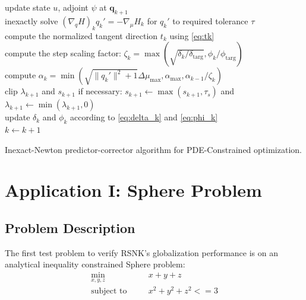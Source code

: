\begin{algorithm}[H]
{  
  update state $u$, adjoint $\psi$ at $\boldsymbol{q}_{k+1}$ \\ 
  \ShowLn
   inexactly solve $\left(\nabla_q H\right)_{k} q_{k}' = - \nabla_\mu H_{k}$
  for $q_{k}'$ to required tolerance $\tau$   \label{line:tang} \\
  compute the normalized tangent direction $t_{k}$ using \eqref{eq:tk} \\
  compute the step scaling factor: $\zeta_{k} = \max\left( \sqrt{\delta_k/\delta_{\text{targ}}}, \phi_k / \phi_{\text{targ}} \right)$\\
  compute $\alpha_{k} = \min\left( \sqrt{\|q_{k}'\|^2 + 1}\Delta \mu_{\max}, \alpha_{\max}, \alpha_{k-1}/\zeta_{k} \right)$\\
  clip $\lambda_{k+1}$ and $s_{k+1}$ if necessary: $s_{k+1} \leftarrow \max(s_{k+1},\tau_s)$ and
  $\lambda_{k+1} \leftarrow \min(\lambda_{k+1},0)$ \\
  update $\delta_k$ and $\phi_{k}$ according to \eqref{eq:delta_k} and
  \eqref{eq:phi_k} \\
  $k \leftarrow k+1$
  }
\caption{Inexact-Newton predictor-corrector algorithm for PDE-Constrained
  optimization.\label{alg:pc}}
\end{algorithm}

\newpage
\section{Application I: Sphere Problem}
\subsection{Problem Description}
The first test problem to verify RSNK's globalization performance is on an analytical inequality constrained Sphere problem: 
\begin{equation*}
\begin{aligned}
\underset{x, y, z} {\text{min}}  & \quad & x + y + z \\
   {\text{subject to}}  & \quad & x^2 + y^2 + z^2 <= 3 \\
\end{aligned}
\end{equation*}

